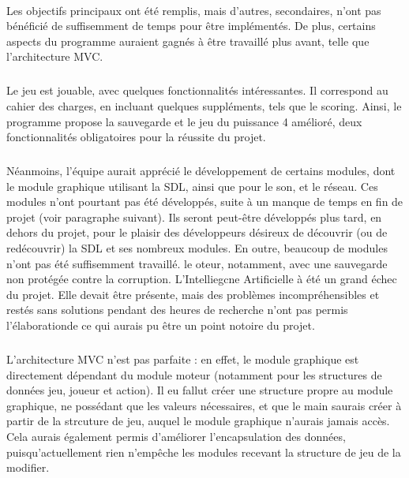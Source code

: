 \documentclass{report}
\begin{document}
    \paragraph*{} %
    Les objectifs principaux ont été remplis, mais d'autres, secondaires, n'ont pas bénéficié de suffisemment de temps pour être implémentés. De plus, certains aspects du programme 
        auraient gagnés à être travaillé plus avant, telle que l'architecture MVC.
        \subparagraph*{} %
        Le jeu est jouable, avec quelques fonctionnalités intéressantes. Il correspond au cahier des charges, en incluant quelques suppléments, tels que le scoring.
        Ainsi, le programme propose la sauvegarde et le jeu du puissance 4 amélioré, deux fonctionnalités obligatoires pour la réussite du projet.
        \subparagraph*{} %
        Néanmoins, l'équipe aurait apprécié le développement de certains modules, dont le module graphique utilisant la SDL, ainsi que pour le son, et le réseau. Ces modules n'ont 
            pourtant pas été développés, suite à un manque de temps en fin de projet (voir paragraphe suivant). Ils seront peut-être développés plus tard, en dehors du projet, 
            pour le plaisir des développeurs désireux de découvrir (ou de redécouvrir) la SDL et ses nombreux modules.
        En outre, beaucoup de modules n'ont pas été suffisemment travaillé. le oteur, notamment, avec une sauvegarde non protégée contre la corruption.
        L'Intelliegcne Artificielle à été un grand échec du projet. Elle devait être présente, mais des problèmes incompréhensibles et restés sans solutions pendant des heures de 
            recherche n'ont pas permis l'élaborationde  ce qui aurais pu être un point notoire du projet.
        \subparagraph*{} %
        L'architecture MVC n'est pas parfaite : en effet, le module graphique est directement dépendant du module moteur (notamment pour les structures de données jeu, joueur et action).
        Il eu fallut créer une structure propre au module graphique, ne possédant que les valeurs nécessaires, et que le main saurais créer à partir de la strcuture de jeu, auquel le
            module graphique n'aurais jamais accès. \\
        Cela aurais également permis d'améliorer l'encapsulation des données, puisqu'actuellement rien n'empêche les modules recevant la structure de jeu de la modifier.
    \newpage
\end{document}
